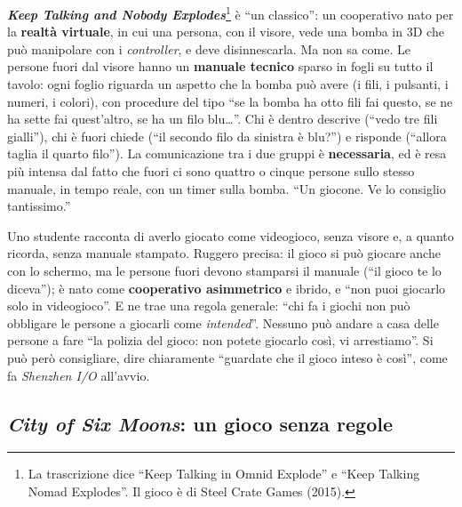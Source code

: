 

\textbf{\emph{Keep Talking and Nobody Explodes}}\footnote{La trascrizione dice ``Keep
Talking in Omnid Explode'' e ``Keep Talking Nomad Explodes''. Il gioco è di Steel
Crate Games (2015).} è ``un classico'': un cooperativo nato per la \textbf{realtà
virtuale}, in cui una persona, con il visore, vede una bomba in 3D che può manipolare con
i \emph{controller}, e deve disinnescarla. Ma non sa come. Le persone fuori dal visore
hanno un \textbf{manuale tecnico} sparso in fogli su tutto il tavolo: ogni foglio
riguarda un aspetto che la bomba può avere (i fili, i pulsanti, i numeri, i colori), con
procedure del tipo ``se la bomba ha otto fili fai questo, se ne ha sette fai
quest'altro, se ha un filo blu\dots''. Chi è dentro descrive (``vedo tre fili gialli''),
chi è fuori chiede (``il secondo filo da sinistra è blu?'') e risponde (``allora taglia il
quarto filo''). La comunicazione tra i due gruppi è \textbf{necessaria}, ed è resa più
intensa dal fatto che fuori ci sono quattro o cinque persone sullo stesso manuale, in
tempo reale, con un timer sulla bomba. ``Un giocone. Ve lo consiglio tantissimo.''

Uno studente racconta di averlo giocato come videogioco, senza visore e, a quanto
ricorda, senza manuale stampato. Ruggero precisa: il gioco si può giocare anche con lo
schermo, ma le persone fuori devono stamparsi il manuale (``il gioco te lo diceva''); è
nato come \textbf{cooperativo asimmetrico} e ibrido, e ``non puoi giocarlo solo in
videogioco''. E ne trae una regola generale: ``chi fa i giochi non può obbligare le
persone a giocarli come \emph{intended}''. Nessuno può andare a casa delle persone a fare
``la polizia del gioco: non potete giocarlo così, vi arrestiamo''. Si può però
consigliare, dire chiaramente ``guardate che il gioco inteso è così'', come fa
\emph{Shenzhen I/O} all'avvio.

\subsection{\emph{City of Six Moons}: un gioco senza regole}



